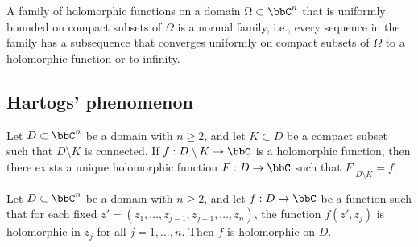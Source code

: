    \begin{theorem}\label{thm:Montel's_Theorem}
        A family of holomorphic functions on a domain \(\Omega \subset \bbC^n\) that is uniformly bounded on compact subsets of \(\Omega\) is a normal family, i.e., every sequence in the family has a subsequence that converges uniformly on compact subsets of \(\Omega\) to a holomorphic function or to infinity.
    \end{theorem}

\subsection{Hartogs' phenomenon}

    \begin{theorem}\label{thm:Hartogs'_Extension_Theorem}
        Let \(D \subset \bbC^n\) be a domain with \(n \geq 2\), and let \(K \subset D\) be a compact subset such that \(D \setminus K\) is connected. If \(f: D \setminus K \to \bbC\) is a holomorphic function, then there exists a unique holomorphic function \(F: D \to \bbC\) such that \(F|_{D \setminus K} = f\).
    \end{theorem}

    \begin{theorem}\label{thm:Hartogs'_Separate_Analyticity_Theorem}
        Let \(D \subset \bbC^n\) be a domain with \(n \geq 2\), and let \(f: D \to \bbC\) be a function such that for each fixed \(z' = (z_1, \ldots, z_{j-1}, z_{j+1}, \ldots, z_n)\), the function \(f(z', z_j)\) is holomorphic in \(z_j\) for all \(j = 1, \ldots, n\). Then \(f\) is holomorphic on \(D\).
    \end{theorem}
